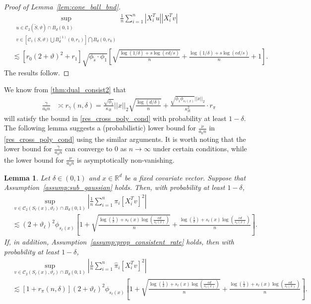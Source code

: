 \documentclass[ejsv2,noshowframe]{imsart}
\theoremstyle{plain}
\newtheorem{lemma}[theorem]{Lemma}
\theoremstyle{definition}
\theoremstyle{remark}
\newcommand{\norm}[1]{\left|\left| #1 \right|\right|}
\renewcommand{\hat}{\widehat}
\renewcommand{\tilde}{\widetilde}
\begin{document}
\begin{proof}[Proof of Lemma~\ref{lem:cone_ball_bnd}]
	\begin{align*}
		&\sup_{\substack{u \in \mathcal{C}_2(\tilde{S},\vartheta) \cap B_d(0,1)\\v\in \left[\mathcal{C}_1(S,\vartheta) \bigcup B_d^{(1)}(0,r_1) \right] \bigcap B_d(0,r_0)}} \frac{1}{n} \sum_{i=1}^n \left|X_i^Tu \right| \left|X_i^Tv \right| \\
		&\lesssim \left[r_0(2+\vartheta)^2+r_1\right] \sqrt{\phi_{\tilde{s}} \cdot \phi_1} \left[\sqrt{\frac{\log(1/\delta) + s\log(ed/s)}{n}} + \frac{\log(1/\delta)  + s\log(ed/s)}{n} + 1\right].
	\end{align*}
	The results follow.
\end{proof}

\vspace{3mm}

We know from \autoref{thm:dual_consist2} that
\begin{align*}
	\frac{\gamma}{a_0n} &\asymp r_{\gamma}(n,\delta) = \frac{\sqrt{\phi_1}}{\kappa_R}\norm{x}_2\sqrt{\frac{\log(d/\delta)}{n}} + \frac{\sqrt{\phi_1 \phi_{s_{\ell}(x)}}\norm{x}_2}{\kappa_R^2} \cdot r_{\pi}
\end{align*}
will satisfy the bound in \eqref{res_cross_poly_cond} with probability at least $1-\delta$. The following lemma suggests a (probabilistic) lower bound for $\frac{\nu}{a_0n}$ in \eqref{res_cross_poly_cond} using the similar arguments. It is worth noting that the lower bound for $\frac{\gamma}{a_0n}$ can converge to 0 as $n\to \infty$ under certain conditions, while the lower bound for $\frac{\nu}{a_0n}$ is asymptotically non-vanishing.  

\begin{lemma}
	\label{lem:rel_poly_cost}
	Let $\delta\in (0,1)$ and $x\in \mathbb{R}^d$ be a fixed covariate vector. Suppose that Assumption~\ref{assump:sub_gaussian} holds. Then, with probability at least $1-\delta$,
	\begin{align*}
		&\sup_{v\in \mathcal{C}_2\left(S_{\ell}(x), \vartheta_{\ell}\right)\cap B_d(0,1)} \left|\frac{1}{n} \sum_{i=1}^n \pi_i\left[X_i^Tv\right]^2 \right| \\
		&\lesssim (2+\vartheta_{\ell})^2 \phi_{s_{\ell}(x)}\left[1+\sqrt{\frac{\log(\frac{1}{\delta})+s_{\ell}(x)\log\left(\frac{ed}{s_{\ell}(x)}\right)}{n}} + \frac{\log(\frac{1}{\delta})+s_{\ell}(x)\log\left(\frac{ed}{s_{\ell}(x)}\right)}{n}\right].
	\end{align*}
	If, in addition, Assumption~\ref{assump:prop_consistent_rate} holds, then with probability at least $1-\delta$,
	\begin{align*}
		&\sup_{v\in \mathcal{C}_2\left(S_{\ell}(x), \vartheta_{\ell}\right)\cap B_d(0,1)} \left|\frac{1}{n} \sum_{i=1}^n \hat{\pi}_i\left[X_i^Tv\right]^2 \right| \\
		&\lesssim \left[1+r_{\pi}(n,\delta)\right] (2+\vartheta_{\ell})^2 \phi_{s_{\ell}(x)}\left[1+\sqrt{\frac{\log(\frac{1}{\delta})+s_{\ell}(x)\log\left(\frac{ed}{s_{\ell}(x)}\right)}{n}} + \frac{\log(\frac{1}{\delta})+s_{\ell}(x)\log\left(\frac{ed}{s_{\ell}(x)}\right)}{n}\right].
	\end{align*}
\end{lemma}
\end{document}
